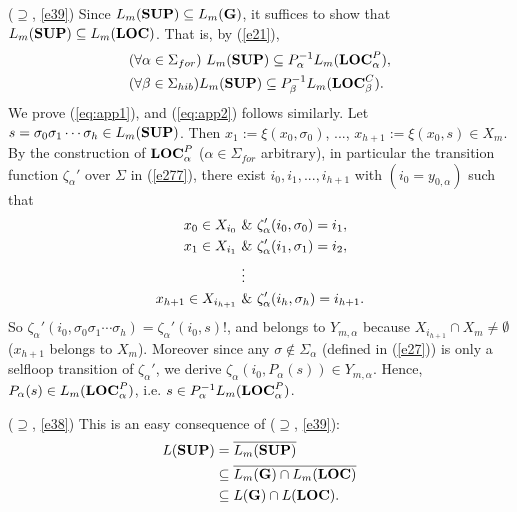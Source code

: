 \documentclass[twocolumn]{autart}
\begin{document}
($\supseteq$, \ref{e39}) Since $L_m({\bf SUP}) \subseteq L_m({\bf
G})$, it suffices to show that $L_m({\bf SUP}) \subseteq L_m({\bf
LOC})$. That is, by (\ref{e21}),
\begin{align} \label{eq:app1}
&(\forall \alpha \in \Sigma_{for})\ L_m({\bf SUP}) \subseteq
P_\alpha^{-1}L_m({\bf LOC}^P_{\alpha}),\\
\label{eq:app2}&(\forall \beta \in \Sigma_{hib})L_m({\bf SUP})
\subseteq P_\beta^{-1}L_m({\bf LOC}^C_{\beta}).
\end{align}
We prove (\ref{eq:app1}), and (\ref{eq:app2}) follows similarly. Let
$s = \sigma_0\sigma_1\cdots\sigma_h \in L_m({\bf SUP})$. Then
$x_1:=\xi(x_0,\sigma_0)$, ..., $x_{h+1} := \xi(x_0,s) \in X_m$. By
the construction of ${\bf LOC}^P_{\alpha}$ ($\alpha \in
\Sigma_{for}$ arbitrary), in particular the transition function
$\zeta_\alpha'$ over $\Sigma$ in (\ref{e277}), there exist $i_0,
i_1, ..., i_{h+1}$ with $(i_0 = y_{0,\alpha})$ such that
\begin{align} \label{e40}
x_0 \in X_{i_0}~&\&~ \zeta_\alpha'(i_0,\sigma_0) = i_1, \notag \\
x_1 \in X_{i_1}~&\&~ \zeta_\alpha'(i_1,\sigma_1) = i_2, \notag\\
&\vdots \\
x_{h+1} \in X_{i_{h+1}}~&\&~ \zeta_\alpha'(i_h,\sigma_h) = i_{h+1}. \notag
\end{align}
So $\zeta_\alpha'(i_0,\sigma_0\sigma_1\cdots\sigma_h)
=\zeta_\alpha'(i_0,s)!$, and belongs to $Y_{m,\alpha}$ because
$X_{i_{h+1}} \cap X_m \neq \emptyset$ ($x_{h+1}$ belongs to $X_m$).
Moreover since any $\sigma \notin \Sigma_\alpha$ (defined in
(\ref{e27})) is only a selfloop transition of $\zeta_\alpha'$, we
derive $\zeta_\alpha(i_0,P_\alpha(s)) \in Y_{m,\alpha}$. Hence,
$P_\alpha(s) \in L_m({\bf LOC}^P_{\alpha})$, i.e. $s\in
P_\alpha^{-1}L_m({\bf LOC}^P_{\alpha})$.

($\supseteq$, \ref{e38}) This is an easy consequence of ($\supseteq$, \ref{e39}):
\begin{align*}
L({\bf SUP}) &= \overline{L_m({\bf SUP})} \\
             &\subseteq \overline{L_m({\bf G}) \cap L_m({\bf LOC})} \\
&\subseteq L({\bf G}) \cap L({\bf LOC}).
\end{align*}
\end{document}
